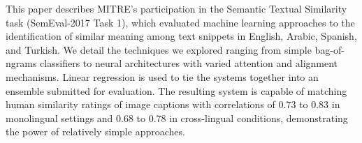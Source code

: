 This paper describes MITRE's participation in the Semantic Textual Similarity task (SemEval-2017 Task 1), which evaluated machine learning approaches to the identification of similar meaning among text snippets in English, Arabic, Spanish, and Turkish. We detail the techniques we explored ranging from simple bag-of-ngrams classifiers to neural architectures with varied attention and alignment mechanisms. Linear regression is used to tie the systems together into an ensemble submitted for evaluation. The resulting system is capable of matching human similarity ratings of image captions with correlations of 0.73 to 0.83 in monolingual settings and 0.68 to 0.78 in cross-lingual conditions, demonstrating the power of relatively simple approaches.
